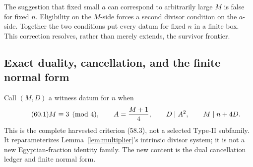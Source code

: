 \documentclass[10pt,reqno]{amsart}
\theoremstyle{definition}
\newcommand{\1}{\mathbf 1}
\begin{document}
The suggestion that fixed small $a$ can correspond to arbitrarily large
$M$ is false for fixed $n$.  Eligibility on the $M$-side forces a second
divisor condition on the $a$-side.  Together the two conditions put every
datum for fixed $n$ in a finite box.  This correction resolves, rather than
merely extends, the survivor frontier.

\subsection{Exact duality, cancellation, and the finite normal form}
Call $(M,D)$ a witness datum for $n$ when
\begin{equation}\tag{60.1}
 M\equiv3\pmod4,\qquad A={M+1\over4},\qquad D\mid A^2,
 \qquad M\mid n+4D.
\end{equation}
This is the complete harvested criterion (58.3), not a selected Type-II
subfamily.  It reparameterizes Lemma~\ref{lem:multiplier}'s intrinsic
divisor system; it is not a new Egyptian-fraction identity family.  The new
content is the dual cancellation ledger and finite normal form.
\end{document}
